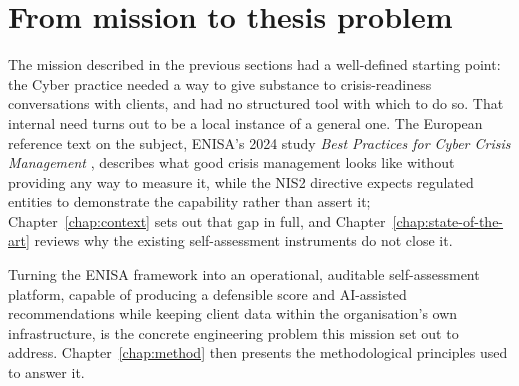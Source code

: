 \section{From mission to thesis problem}
\label{sec:framing-bridge}

The mission described in the previous sections had a well-defined starting
point: the Cyber practice needed a way to give substance to crisis-readiness
conversations with clients, and had no structured tool with which to do so.
That internal need turns out to be a local instance of a general one. The
European reference text on the subject, ENISA's 2024 study \emph{Best Practices
for Cyber Crisis Management} \cite{enisa_crisis_mgmt_2024}, describes what good
crisis management looks like without providing any way to measure it, while the
NIS2 directive \cite{nis2_directive_2022} expects regulated entities to
demonstrate the capability rather than assert it; Chapter~\ref{chap:context}
sets out that gap in full, and Chapter~\ref{chap:state-of-the-art} reviews why
the existing self-assessment instruments do not close it.

Turning the ENISA framework into an operational, auditable self-assessment
platform, capable of producing a defensible score and AI-assisted
recommendations while keeping client data within the organisation's own
infrastructure, is the concrete engineering problem this mission set out to
address. Chapter~\ref{chap:method} then presents the methodological principles
used to answer it.